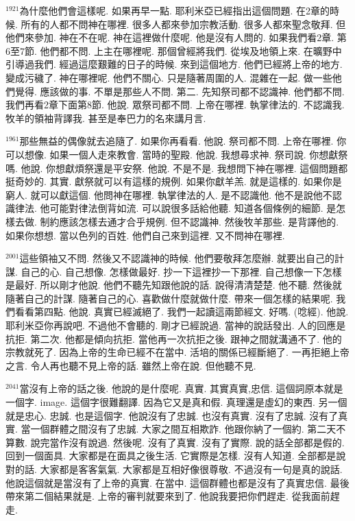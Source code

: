 \documentclass{book}
\begin{document}
$^{1921}$為什麼他們會這樣呢.
如果再早一點.
耶利米亞已經指出這個問題.
在2章的時候.
所有的人都不問神在哪裡.
很多人都來參加宗教活動.
很多人都來聖念敬拜.
但他們來參加.
神在不在呢.
神在這裡做什麼呢.
他是沒有人問的.
如果我們看2章.
第6至7節.
他們都不問.
上主在哪裡呢.
那個曾經將我們.
從埃及地領上來.
在曠野中引導過我們.
經過這麼艱難的日子的時候.
來到這個地方.
他們已經將上帝的地方.
變成污穢了.
神在哪裡呢.
他們不關心.
只是隨著周圍的人.
混雜在一起.
做一些他們覺得.
應該做的事.
不單是那些人不問.
第二.
先知祭司都不認識神.
他們都不問.
我們再看2章下面第8節.
他說.
眾祭司都不問.
上帝在哪裡.
執掌律法的.
不認識我.
牧羊的領袖背譯我.
甚至是奉巴力的名來講月言.

$^{1961}$那些無益的偶像就去追隨了.
如果你再看看.
他說.
祭司都不問.
上帝在哪裡.
你可以想像.
如果一個人走來教會.
當時的聖殿.
他說.
我想尋求神.
祭司說.
你想獻祭嗎.
他說.
你想獻煩祭還是平安祭.
他說.
不是不是.
我想問下神在哪裡.
這個問題都挺奇妙的.
其實.
獻祭就可以有這樣的規例.
如果你獻羊羔.
就是這樣的.
如果你是窮人.
就可以獻這個.
他問神在哪裡.
執掌律法的人.
是不認識他.
他不是說他不認識律法.
他可能對律法倒背如流.
可以說很多話給他聽.
知道各個條例的細節.
是怎樣去做.
制約應該怎樣去通才合乎規例.
但不認識神.
然後牧羊那些.
是背譯他的.
如果你想想.
當以色列的百姓.
他們自己來到這裡.
又不問神在哪裡.

$^{2001}$這些領袖又不問.
然後又不認識神的時候.
他們要敬拜怎麼辦.
就要出自己的計謀.
自己的心.
自己想像.
怎樣做最好.
抄一下這裡抄一下那裡.
自己想像一下怎樣是最好.
所以剛才他說.
他們不聽先知跟他說的話.
說得清清楚楚.
他不聽.
然後就隨著自己的計謀.
隨著自己的心.
喜歡做什麼就做什麼.
帶來一個怎樣的結果呢.
我們看看第四點.
他說.
真實已經滅絕了.
我們一起讀這兩節經文.
好嗎.
(唸經).
他說.
耶利米亞你再說吧.
不過他不會聽的.
剛才已經說過.
當神的說話發出.
人的回應是抗拒.
第二次.
他都是傾向抗拒.
當他再一次抗拒之後.
跟神之間就溝通不了.
他的宗教就死了.
因為上帝的生命已經不在當中.
活培的關係已經斷絕了.
一再拒絕上帝之言.
令人再也聽不見上帝的話.
雖然上帝在說.
但他聽不見.

$^{2041}$當沒有上帝的話之後.
他說的是什麼呢.
真實.
其實真實,忠信.
這個詞原本就是一個字.
image.
這個字很難翻譯.
因為它又是真和假.
真理還是虛幻的東西.
另一個就是忠心.
忠誠.
也是這個字.
他說沒有了忠誠.
也沒有真實.
沒有了忠誠.
沒有了真實.
當一個群體之間沒有了忠誠.
大家之間互相欺詐.
他跟你納了一個約.
第二天不算數.
說完當作沒有說過.
然後呢.
沒有了真實.
沒有了實際.
說的話全部都是假的.
回到一個面具.
大家都是在面具之後生活.
它實際是怎樣.
沒有人知道.
全部都是說對的話.
大家都是客客氣氣.
大家都是互相好像很尊敬.
不過沒有一句是真的說話.
他說這個就是當沒有了上帝的真實.
在當中.
這個群體也都是沒有了真實忠信.
最後帶來第二個結果就是.
上帝的審判就要來到了.
他說我要把你們趕走.
從我面前趕走.
\end{document}
